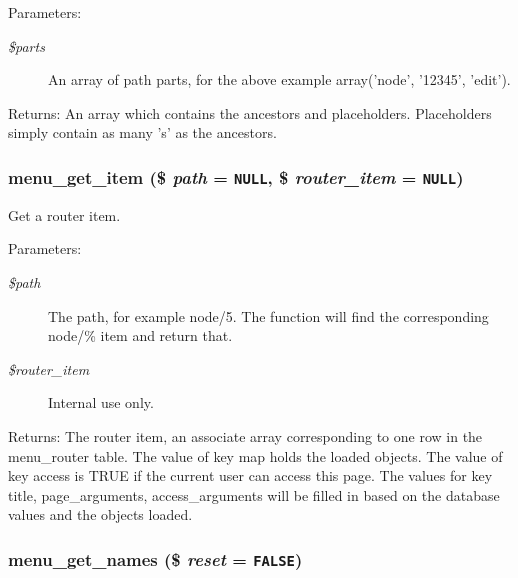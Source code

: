 \begin{Desc}
\item[Parameters:]
\begin{description}
\item[{\em \$parts}]An array of path parts, for the above example array('node', '12345', 'edit'). \end{description}
\end{Desc}
\begin{Desc}
\item[Returns:]An array which contains the ancestors and placeholders. Placeholders simply contain as many 's' as the ancestors. \end{Desc}
\hypertarget{group__menu_g855b1ca6ef9e44eb6107a2b9d0f581df}{
\subsubsection[{menu\_\-get\_\-item}]{\setlength{\rightskip}{0pt plus 5cm}menu\_\-get\_\-item (\$ {\em path} = {\tt NULL}, \/  \$ {\em router\_\-item} = {\tt NULL})}}
\label{group__menu_g855b1ca6ef9e44eb6107a2b9d0f581df}


Get a router item.

\begin{Desc}
\item[Parameters:]
\begin{description}
\item[{\em \$path}]The path, for example node/5. The function will find the corresponding node/\% item and return that. \item[{\em \$router\_\-item}]Internal use only. \end{description}
\end{Desc}
\begin{Desc}
\item[Returns:]The router item, an associate array corresponding to one row in the menu\_\-router table. The value of key map holds the loaded objects. The value of key access is TRUE if the current user can access this page. The values for key title, page\_\-arguments, access\_\-arguments will be filled in based on the database values and the objects loaded. \end{Desc}
\hypertarget{group__menu_gb537c9640c2d63c4c5208412987d7045}{
\subsubsection[{menu\_\-get\_\-names}]{\setlength{\rightskip}{0pt plus 5cm}menu\_\-get\_\-names (\$ {\em reset} = {\tt FALSE})}}
\label{group__menu_gb537c9640c2d63c4c5208412987d7045}


